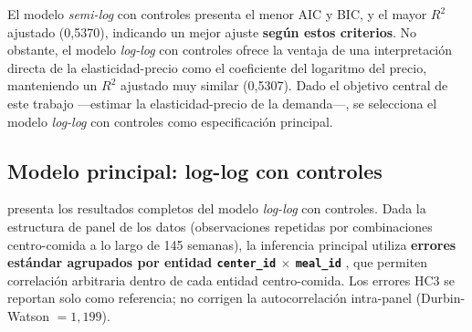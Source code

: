 \documentclass[doc, a4paper, biblatex, floatsintext, longtable, babel]{apa7}
\begin{document}
El modelo \textit{semi-log} con controles presenta el menor AIC y BIC, y el mayor $R^2$ ajustado (0,5370), indicando un mejor ajuste \textbf{según estos criterios}. No obstante, el modelo \textit{log-log} con controles ofrece la ventaja de una interpretaci\'on directa de la elasticidad-precio como el coeficiente del logaritmo del precio, manteniendo un $R^2$ ajustado muy similar (0,5307). Dado el objetivo central de este trabajo ---estimar la elasticidad-precio de la demanda---, se selecciona el modelo \textit{log-log} con controles como especificaci\'on principal.

\subsection{Modelo principal: log-log con controles}
\label{subsec:modelo_principal}

 presenta los resultados completos del modelo \textit{log-log} con controles. Dada la estructura de panel de los datos (observaciones repetidas por combinaciones centro-comida a lo largo de 145 semanas), la inferencia principal utiliza \textbf{errores estándar agrupados por entidad \texttt{center\_id} $\times$ \texttt{meal\_id}} \parencite{cameron2015practitioner}, que permiten correlación arbitraria dentro de cada entidad centro-comida. Los errores HC3 se reportan solo como referencia; no corrigen la autocorrelación intra-panel (Durbin-Watson $=1,199$).
\end{document}

